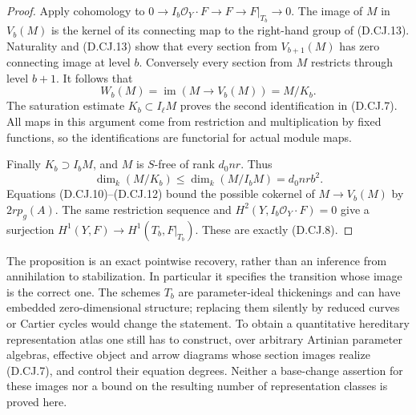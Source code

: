 \begin{proof}
Apply cohomology to
$0\to I_b\mathcal O_Y\cdot F\to F\to F|_{T_b}\to0$.
The image of $M$ in $V_b(M)$ is the kernel of its connecting
map to the right-hand group of (D.CJ.13). Naturality and
(D.CJ.13) show that every section from $V_{b+1}(M)$ has zero
connecting image at level $b$. Conversely every section from
$M$ restricts through level $b+1$. It follows that
\[
             W_b(M)=\operatorname{im}(M\to V_b(M))=M/K_b.
\]
The saturation estimate $K_b\subset I_\ell M$ proves the
second identification in (D.CJ.7). All maps in this argument
come from restriction and multiplication by fixed functions,
so the identifications are functorial for actual module maps.

Finally $K_b\supset I_bM$, and $M$ is $S$-free of rank
$d_0nr$. Thus
\[
 \dim_k(M/K_b)\le\dim_k(M/I_bM)=d_0nrb^2.
\]
Equations (D.CJ.10)--(D.CJ.12) bound the possible cokernel of
$M\to V_b(M)$ by $2r p_g(A)$. The same restriction sequence
and $H^2(Y,I_b\mathcal O_Y\cdot F)=0$ give a surjection
$H^1(Y,F)\to H^1(T_b,F|_{T_b})$. These are exactly (D.CJ.8).
\end{proof}

\begin{remark}
The proposition is an exact pointwise recovery, rather than
an inference from annihilation to stabilization. In particular
it specifies the transition whose image is the correct one.
The schemes $T_b$ are parameter-ideal thickenings and can have
embedded zero-dimensional structure; replacing them silently
by reduced curves or Cartier cycles would change the statement.
To obtain a quantitative hereditary representation atlas one
still has to construct, over arbitrary Artinian parameter
algebras, effective object and arrow diagrams whose section
images realize (D.CJ.7), and control their equation degrees.
Neither a base-change assertion for these images nor a bound
on the resulting number of representation classes is proved here.
\end{remark}
